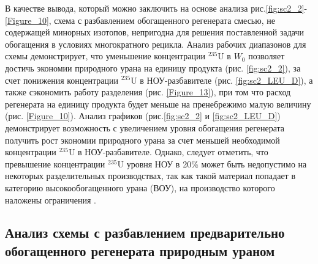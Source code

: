 

В качестве вывода, который можно заключить на основе анализа рис.\ref{fig:sc2_2}-\ref{Figure_10}, схема с разбавлением обогащенного регенерата смесью, не содержащей минорных изотопов, непригодна для решения поставленной задачи обогащения в условиях многократного рецикла. Анализ рабочих диапазонов для схемы демонстрирует, что уменьшение концентрации $^{235}$U в $W_0$ позволяет достичь экономии природного урана на единицу продукта (рис. \ref{fig:sc2_2}), за счет понижения концентрации $^{235}$U в НОУ-разбавителе (рис. \ref{fig:sc2_LEU_D}), а также сэкономить работу разделения (рис. \ref{Figure_13}), при том что расход регенерата на единицу продукта будет меньше на пренебрежимо малую величину (рис. \ref{Figure_10}). Анализ графиков (рис.\ref{fig:sc2_2} и \ref{fig:sc2_LEU_D}) демонстрирует возможность с увеличением уровня обогащения регенерата получить рост экономии природного урана за счет меньшей необходимой концентрации $^{235}$U в НОУ-разбавителе. Однако, следует отметить, что превышение концентрации $^{235}$U уровня НОУ в 20\% может быть недопустимо на некоторых разделительных производствах, так как такой материал попадает в категорию высокообогащенного урана (ВОУ), на производство которого наложены ограничения \cite{gusevProliferationResistanceAnalysis2019}.


\subsection{Анализ схемы с разбавлением предварительно обогащенного регенерата природным ураном}

